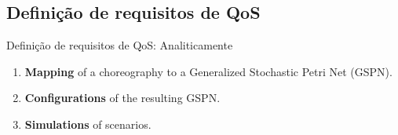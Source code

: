 \documentclass[xcolor=svgnames]{beamer}
\begin{document}
\subsection{Definição de requisitos de QoS}
  \begin{frame}{Definição de requisitos de QoS: Analiticamente}
      \begin{enumerate}
	\item <1-> \textbf{Mapping} of a choreography to a Generalized Stochastic Petri Net (GSPN).

	\item <2-> \textbf{Configurations} of the resulting GSPN.
	\item <3-> \textbf{Simulations} of scenarios.
      \end{enumerate}

  \end{frame}
  
\end{document}
